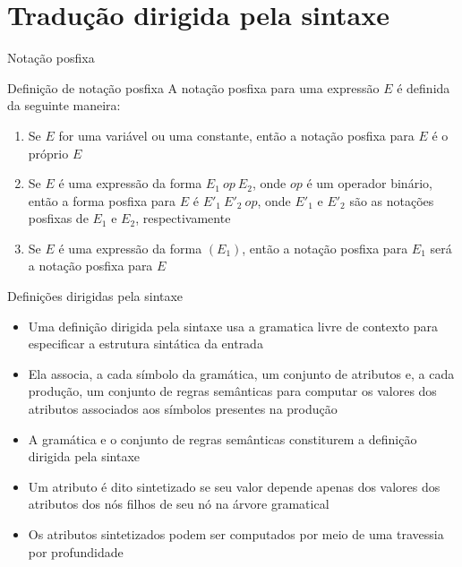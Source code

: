 \section{Tradução dirigida pela sintaxe}

\begin{frame}[fragile]{Notação posfixa}

    \begin{block}{Definição de notação posfixa}
    A notação posfixa para uma expressão $E$ é definida da seguinte maneira:

    \begin{enumerate}
        \item Se $E$ for uma variável ou uma constante, então a notação posfixa para $E$ é o próprio $E$

        \item Se $E$ é uma expressão da forma $E_1\ op\ E_2$, onde $op$ é um operador binário, então a forma posfixa para $E$ é $E'_1\ E'_2\ op$, onde $E'_1$ e 
            $E'_2$ são as notações posfixas de $E_1$ e $E_2$, respectivamente

        \item Se $E$ é uma expressão da forma $(E_1)$, então a notação posfixa para $E_1$ será a notação posfixa para $E$
    \end{enumerate}
    \end{block}

\end{frame}

\begin{frame}[fragile]{Definições dirigidas pela sintaxe}

    \begin{itemize}
        \item Uma definição dirigida pela sintaxe usa a gramatica livre de contexto para especificar a estrutura sintática da entrada

        \item Ela associa, a cada símbolo da gramática, um conjunto de atributos e, a cada produção, um conjunto de regras semânticas para computar os valores
            dos atributos associados aos símbolos presentes na produção

        \item A gramática e o conjunto de regras semânticas constiturem a definição dirigida pela sintaxe

        \item Um atributo é dito sintetizado se seu valor depende apenas dos valores dos atributos dos nós filhos de seu nó na árvore gramatical

        \item Os atributos sintetizados podem ser computados por meio de uma travessia por profundidade
    \end{itemize}

\end{frame}

